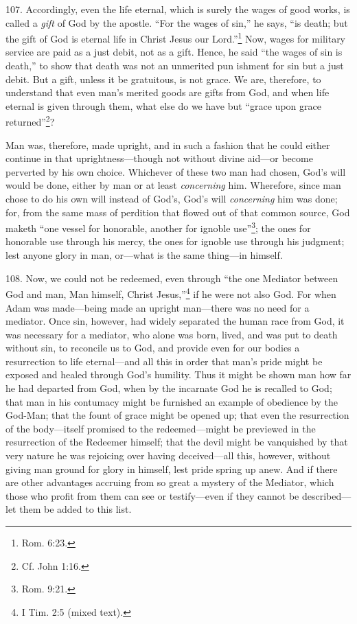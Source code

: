 107. Accordingly, even the life eternal, which is surely the wages of good works, is called a \emph{gift} of God by the apostle. ``For the wages of sin,'' he says, ``is death; but the gift of God is eternal life in Christ Jesus our Lord.''\footnote{Rom. 6:23.} Now, wages for military service are paid as a just debit, not as a gift. Hence, he said ``the wages of sin is death,'' to show that death was not an unmerited pun ishment for sin but a just debit. But a gift, unless it be gratuitous, is not grace. We are, therefore, to understand that even man's merited goods are gifts from God, and when life eternal is given through them, what else do we have but ``grace upon grace returned''\footnote{Cf. John 1:16.}?

Man was, therefore, made upright, and in such a fashion that he could either continue in that uprightness—though not without divine aid—or become perverted by his own choice. Whichever of these two man had chosen, God's will would be done, either by man or at least \emph{concerning} him. Wherefore, since man chose to do his own will instead of God's, God's will \emph{concerning} him was done; for, from the same mass of perdition that flowed out of that common source, God maketh ``one vessel for honorable, another for ignoble use''\footnote{Rom. 9:21.}; the ones for honorable use through his mercy, the ones for ignoble use through his judgment; lest anyone glory in man, or—what is the same thing—in himself.

108. Now, we could not be redeemed, even through ``the one Mediator between God and man, Man himself, Christ Jesus,''\footnote{I Tim. 2:5 (mixed text).} if he were not also God. For when Adam was made—being made an upright man—there was no need for a mediator. Once sin, however, had widely separated the human race from God, it was necessary for a mediator, who alone was born, lived, and was put to death without sin, to reconcile us to God, and provide even for our bodies a resurrection to life eternal—and all this in order that man's pride might be exposed and healed through God's humility. Thus it might be shown man how far he had departed from God, when by the incarnate God he is recalled to God; that man in his contumacy might be furnished an example of obedience by the God-Man; that the fount of grace might be opened up; that even the resurrection of the body—itself promised to the redeemed—might be previewed in the resurrection of the Redeemer himself; that the devil might be vanquished by that very nature he was rejoicing over having deceived—all this, however, without giving man ground for glory in himself, lest pride spring up anew. And if there are other advantages accruing from so great a mystery of the Mediator, which those who profit from them can see or testify—even if they cannot be described—let them be added to this list.


